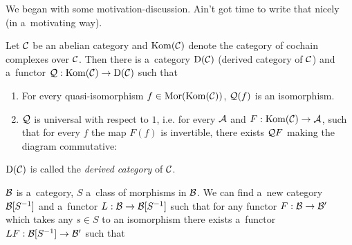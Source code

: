 




	We began with some motivation-discussion. 
	Ain't got time to write that nicely (in a~motivating way).
	
	\begin{theorem}
		Let $\mathcal{C}$ be an abelian category and $\mathrm{Kom}(\mathcal{C})$ denote the category
		of cochain complexes over $\mathcal{C}$. 
		Then there is a~category $\mathrm{D}(\mathcal{C})$ (derived category of $\mathcal{C}$)
		and a~functor $\mathcal{Q}:\mathrm{Kom}(\mathcal{C}) \to \mathrm{D}(\mathcal{C})$
		such that
		\begin{enumerate}
			\item For every quasi-isomorphism $f \in \mathrm{Mor}(\mathrm{Kom}(\mathcal{C}))$,
			$\mathcal{Q}(f)$ is an isomorphism.
			
			\item $\mathcal{Q}$ is universal with respect to $1$, i.e.
			for every $\mathcal{A}$ and $F:\mathrm{Kom}(\mathcal{C}) \to \mathcal{A}$, such that
			for every \qi $f$ the map $F(f)$ is invertible,
			there exists $\mathcal{Q} F$ making the diagram commutative:
			

		\end{enumerate}
		
		$\mathrm{D}(\mathcal{C})$ is called the \emph{derived category} of $\mathcal{C}$.
	\end{theorem}
	
	\begin{definition}
		$\mathcal{B}$ is a~category, $S$ a~class of morphisms in $\mathcal{B}$.
		We can find a~new category $\mathcal{B}[S^{-1}]$ and a~functor
		$L:\mathcal{B} \to \mathcal{B}[S^{-1}]$ such that 
		for any functor $F: \mathcal{B} \to \mathcal{B}'$ which takes any $s \in S$
		to an isomorphism there exists a~functor $LF:\mathcal{B}[S^{-1}] \to \mathcal{B}'$
		such that
		
	\end{definition}
	
